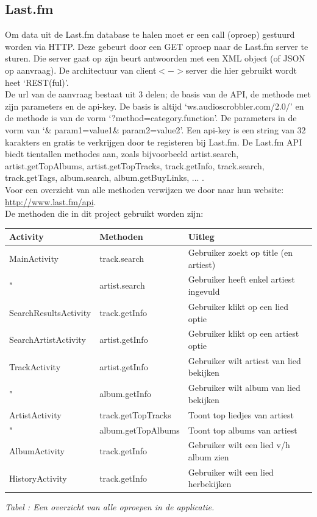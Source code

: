 \documentclass[11pt,a4paper]{article}
\newcounter{tabc}
\newcommand{\increaseTabID} {%
   \stepcounter{tabc}%
   \thetabc}
\newcommand{\tabID}[1]{\small \textit{Tabel \increaseTabID : #1} \\ \normalsize}
\begin{document}
		
			\subsection{Last.fm}
	\label{sec:Tracks omzetten}
	
Om data uit de Last.fm database te halen moet er een call (oproep) gestuurd worden via HTTP. Deze gebeurt door een GET oproep naar de Last.fm server te sturen. Die server gaat op zijn beurt antwoorden met een XML object (of JSON op aanvraag). De architectuur van client$<->$server die hier gebruikt wordt heet `REST(ful)'. \\

De url van de aanvraag bestaat uit 3 delen; de basis van de API, de methode met zijn parameters en de api-key. De basis is altijd `ws.audioscrobbler.com/2.0/' en de methode is van de vorm `?method=category.function'. De parameters in de vorm van `\& param1=value1\& param2=value2'. Een api-key is een string van 32 karakters en gratis te verkrijgen door te registeren bij Last.fm.
De Last.fm API biedt tientallen methodes aan, zoals bijvoorbeeld artist.search, artist.getTopAlbums, artist.getTopTracks, track.getInfo, track.search, track.getTags, album.search, album.getBuyLinks, ... . \\
Voor een overzicht van alle methoden verwijzen we door naar hun website: \url{http://www.last.fm/api}. \\ 

De methoden die in dit project gebruikt worden zijn: \\

\hspace{-4em} \begin{tabular}{| l | l | l |}
\hline
	Activity 				&	Methoden			& Uitleg \\ \hline
	MainActivity			&	track.search 		& Gebruiker zoekt op title (en artiest) \\
	"						&	artist.search 		& Gebruiker heeft enkel artiest ingevuld \\ \hline
	SearchResultsActivity	&	track.getInfo		& Gebruiker klikt op een lied optie \\ \hline
	SearchArtistActivity	&	artist.getInfo		& Gebruiker klikt op een artiest optie \\ \hline
	TrackActivity			&	artist.getInfo		& Gebruiker wilt artiest van lied bekijken \\
	"						&	album.getInfo		& Gebruiker wilt album van lied bekijken \\ \hline
	ArtistActivity			&	track.getTopTracks	& Toont top liedjes van artiest \\
	"						&	album.getTopAlbums	& Toont top albums van artiest  \\ \hline
	AlbumActivity			&	track.getInfo		& Gebruiker wilt een lied v/h album zien \\ \hline
	HistoryActivity			&	track.getInfo		& Gebruiker wilt een lied herbekijken \\
\hline
\end{tabular}
	\tabID{Een overzicht van alle oproepen in de applicatie.} 
\end{document}
